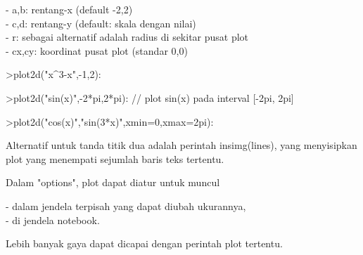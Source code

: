 \documentclass{article}
\begin{document}
\begin{eulernotebook}
\begin{eulercomment}
\begin{eulercomment}
\begin{eulercomment}
\begin{eulercomment}
\begin{eulercomment}
\begin{eulercomment}
\begin{eulercomment}
- a,b: rentang-x (default -2,2)\\
- c,d: rentang-y (default: skala dengan nilai)\\
- r: sebagai alternatif adalah radius di sekitar pusat plot\\
- cx,cy: koordinat pusat plot (standar 0,0)
\end{eulercomment}
\begin{eulerprompt}
>plot2d("x^3-x",-1,2):
\end{eulerprompt}
\begin{eulerprompt}
>plot2d("sin(x)",-2*pi,2*pi): // plot sin(x) pada interval [-2pi, 2pi]
\end{eulerprompt}
\begin{eulerprompt}
>plot2d("cos(x)","sin(3*x)",xmin=0,xmax=2pi):
\end{eulerprompt}
\begin{eulercomment}
Alternatif untuk tanda titik dua adalah perintah insimg(lines), yang
menyisipkan plot yang menempati sejumlah baris teks tertentu.

Dalam "options", plot dapat diatur untuk muncul

- dalam jendela terpisah yang dapat diubah ukurannya,\\
- di jendela notebook.

Lebih banyak gaya dapat dicapai dengan perintah plot tertentu.


\end{eulercomment}
\end{eulercomment}
\end{eulercomment}
\end{eulercomment}
\end{eulercomment}
\end{eulercomment}
\end{eulercomment}
\end{eulernotebook}
\end{document}
